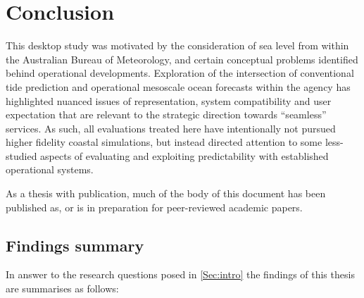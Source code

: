 \chapter{Conclusion}
\label{chp:conclusions}
This desktop study was motivated by the consideration of sea level from within the Australian Bureau of Meteorology, and certain conceptual problems identified behind operational developments.
Exploration of the intersection of conventional tide prediction and operational mesoscale ocean forecasts within the agency has highlighted nuanced issues of representation, system compatibility and user expectation that are relevant to the strategic direction towards ``seamless'' services.
As such, all evaluations treated here have intentionally not pursued higher fidelity coastal simulations, but instead directed attention to some less-studied aspects of evaluating and exploiting predictability with established operational systems.   

As a thesis with publication, much of the body of this document has been published as, or is in preparation for peer-reviewed academic papers.
\section{Findings summary}
In answer to the research questions posed in \ref{Sec:intro} the findings of this thesis are summarises as follows:

